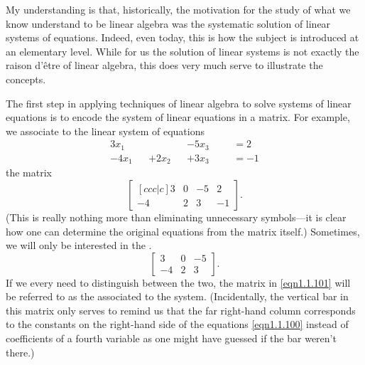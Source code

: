 My understanding is that, historically, the motivation for the study of what we know understand to be linear algebra was the systematic solution of linear systems of equations.  Indeed, even today, this is how the subject is introduced at an elementary level.  While for us the solution of linear systems is not exactly the raison d'être of linear algebra, this does very much serve to illustrate the concepts.

The first step in applying techniques of linear algebra to solve systems of linear equations is to encode the system of linear equations in a matrix.  For example, we associate to the linear system of equations
\begin{subequations}\label{eqn1.1.100}
	\begin{align}
	3x_1 & & & & -5x_3 & & & =2 \\
	-4x_1 & & +2x_2& & +3x_3& & &=-1
	\end{align}
\end{subequations}
the matrix
\begin{equation}\label{eqn1.1.101}
\begin{bmatrix}[c c c | c]3 & 0 & -5 & 2 \\ -4 & 2 & 3 & -1\end{bmatrix}.
\end{equation}
(This is really nothing more than eliminating unnecessary symbols---it is clear how one can determine the original equations from the matrix itself.)  Sometimes, we will only be interested in the .
\begin{equation}
\begin{bmatrix}3 & 0 & -5 \\ -4 & 2 & 3\end{bmatrix}.
\end{equation}
If we every need to distinguish between the two, the matrix in \eqref{eqn1.1.101} will be referred to as the  associated to the system.   (Incidentally, the vertical bar in this matrix only serves to remind us that the far right-hand column corresponds to the constants on the right-hand side of the equations \eqref{eqn1.1.100} instead of coefficients of a fourth variable as one might have guessed if the bar weren't there.)

